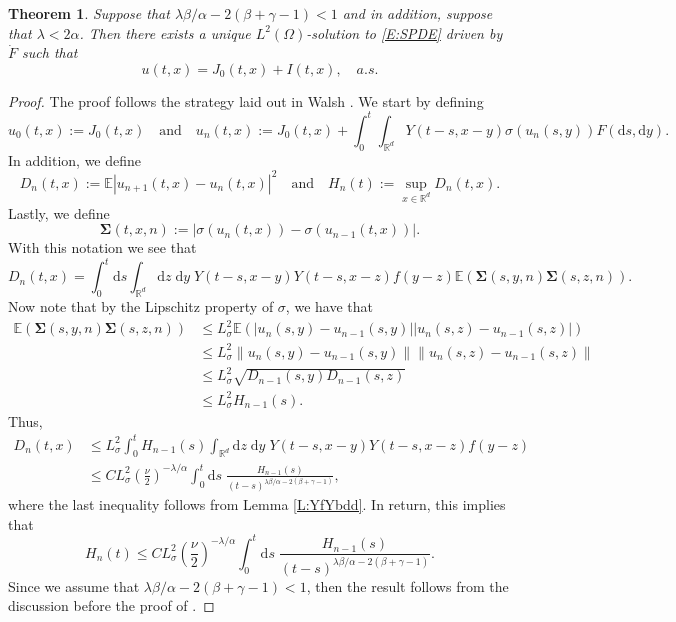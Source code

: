 \documentclass[a4paper,11pt]{article}
\numberwithin{equation}{section}
\theoremstyle{plain}
\newtheorem{theorem}{Theorem}[section]
\theoremstyle{definition}
\newcommand{\ud}{\ensuremath{\mathrm{d} }}
\newcommand{\Norm}[1]{\left\|  #1   \right\|}
\newcommand{\R}{\mathbb{R}}
\numberwithin{NQ}{section}
\numberwithin{LQ}{section}
\numberwithin{ZQ}{section}
\begin{document}
	\begin{theorem}
		\label{T:ExisAndUniq}
		Suppose that $\lambda \beta / \alpha - 2(\beta + \gamma -1) < 1$ and in addition, suppose that $\lambda < 2 \alpha$. Then there exists a unique $L^2(\Omega)$-solution to \eqref{E:SPDE} driven by $\dot{F}$ such that 
		\[
		u(t,x) = J_0(t,x) + I(t,x), \quad a.s.
		\]
	\end{theorem} 
	\begin{proof}
		The proof follows the strategy laid out in Walsh \cite{Walsh89}. We start by defining 
		\[
		u_0(t,x) := J_0(t,x) \quad \text{and} \quad u_n(t,x) := J_0(t,x) + \int_0^t \int_{\R^d} Y(t-s,x-y) \sigma(u_n(s,y)) F(\ud s, \ud y). 
		\]
		In addition, we define 
		\[
		D_n(t,x) := \mathbb{E}\left| u_{n+1}(t,x) - u_n(t,x) \right|^2 \quad \text{and} \quad H_n(t) := \sup_{x \in \R^d} D_n(t,x).
		\]
		Lastly, we define 
		\[
		\mathbf{\Sigma} (t,x,n) := | \sigma( u_n(t,x) ) - \sigma(u_{n-1} (t,x) ) |.
		\]
		With this notation we see that 
		\[
		D_n(t,x) = \int_0^t \ud s \int_{\R^d} \ud z \; \ud y \; Y(t-s,x-y) Y(t-s,x-z) f(y-z) \mathbb{E}\left(\mathbf{\Sigma}(s,y,n) \mathbf{\Sigma}(s,z,n)\right).
		\]
		Now note that by the Lipschitz property of $\sigma$, we have that  
		\begin{align*}
		\mathbb{E}\left(\mathbf{\Sigma}(s,y,n) \mathbf{\Sigma}(s,z,n)\right) &\le L^2_{\sigma} \mathbb{E} \left(|u_n(s,y)-u_{n-1}(s,y)||u_n(s,z)-u_{n-1}(s,z)|\right) \\
		& \le L^2_{\sigma} \Norm{ u_n(s,y)-u_{n-1}(s,y) } \Norm{u_n(s,z)-u_{n-1}(s,z)} \\ 
		& \le L^2_{\sigma} \sqrt{D_{n-1}(s,y) D_{n-1}(s,z)} \\
		& \le L^2_{\sigma} H_{n-1}(s).
		\end{align*}
		Thus, 
		\begin{align*}
		D_n(t,x) &\le L^2_{\sigma} \int_0^t H_{n-1}(s) \int_{\R^d} \ud z \; \ud y \; Y(t-s,x-y) Y(t-s,x-z) f(y-z) \\
		&\le C L^2_{\sigma} \left(\frac{\nu}{2}\right)^{-\lambda / \alpha} \int_0^t \ud s \; \frac{H_{n-1}(s)}{(t-s)^{\lambda \beta / \alpha - 2(\beta + \gamma -1)}},
		\end{align*}
		where the last inequality follows from Lemma \ref{L:YfYbdd}. In return, this implies that 
		\[
		H_n(t) \le C L^2_{\sigma} \left(\frac{\nu}{2}\right)^{-\lambda / \alpha} \int_0^t \ud s \; \frac{H_{n-1}(s)}{(t-s)^{\lambda \beta / \alpha - 2(\beta + \gamma -1)}}.
		\]
		Since we assume that $\lambda \beta / \alpha - 2(\beta + \gamma -1) < 1$, then the result follows from the discussion before the proof of \cite[Lemma 3.3]{Walsh89}. 
	\end{proof}
	
\end{document}
